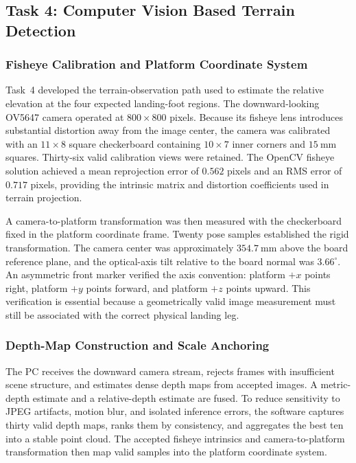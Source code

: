 \documentclass{engr1000j-s2}
\begin{document}
\newpage

\subsection{Task 4: Computer Vision Based Terrain Detection}
\label{task:cv-terrain}

\subsubsection{Fisheye Calibration and Platform Coordinate System}

Task~4 developed the terrain-observation path used to estimate the relative elevation at the four expected landing-foot regions. The downward-looking OV5647 camera operated at $800\times800$ pixels. Because its fisheye lens introduces substantial distortion away from the image center, the camera was calibrated with an $11\times8$ square checkerboard containing $10\times7$ inner corners and $15~\mathrm{mm}$ squares. Thirty-six valid calibration views were retained. The OpenCV fisheye solution achieved a mean reprojection error of $0.562$ pixels and an RMS error of $0.717$ pixels, providing the intrinsic matrix and distortion coefficients used in terrain projection.

A camera-to-platform transformation was then measured with the checkerboard fixed in the platform coordinate frame. Twenty pose samples established the rigid transformation. The camera center was approximately $354.7~\mathrm{mm}$ above the board reference plane, and the optical-axis tilt relative to the board normal was $3.66^\circ$. An asymmetric front marker verified the axis convention: platform $+x$ points right, platform $+y$ points forward, and platform $+z$ points upward. This verification is essential because a geometrically valid image measurement must still be associated with the correct physical landing leg.

\subsubsection{Depth-Map Construction and Scale Anchoring}

The PC receives the downward camera stream, rejects frames with insufficient scene structure, and estimates dense depth maps from accepted images. A metric-depth estimate and a relative-depth estimate are fused. To reduce sensitivity to JPEG artifacts, motion blur, and isolated inference errors, the software captures thirty valid depth maps, ranks them by consistency, and aggregates the best ten into a stable point cloud. The accepted fisheye intrinsics and camera-to-platform transformation then map valid samples into the platform coordinate system.
\end{document}
